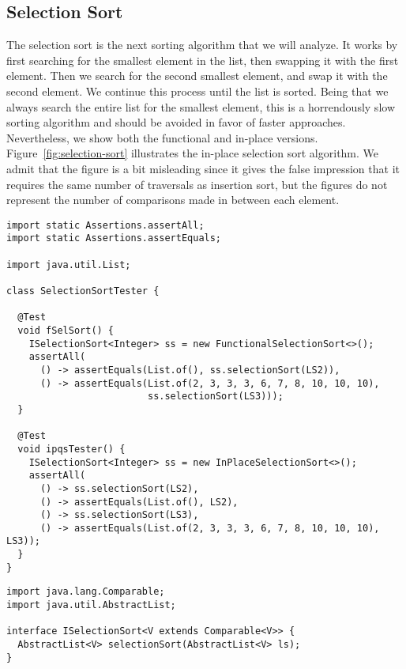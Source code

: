 \subsection{Selection Sort}
The selection sort is the next sorting algorithm that we will analyze. It works by first searching for the smallest element in the list, then swapping it with the first element. Then we search for the second smallest element, and swap it with the second element. We continue this process until the list is sorted. Being that we always search the entire list for the smallest element, this is a horrendously slow sorting algorithm and should be avoided in favor of faster approaches. Nevertheless, we show both the functional and in-place versions. Figure~\ref{fig:selection-sort} illustrates the in-place selection sort algorithm. We admit that the figure is a bit misleading since it gives the false impression that it requires the same number of traversals as insertion sort, but the figures do not represent the number of comparisons made in between each element.

\begin{lstlisting}[language=MyJava]
import static Assertions.assertAll;
import static Assertions.assertEquals;

import java.util.List;

class SelectionSortTester {

  @Test
  void fSelSort() {
    ISelectionSort<Integer> ss = new FunctionalSelectionSort<>();
    assertAll(
      () -> assertEquals(List.of(), ss.selectionSort(LS2)),
      () -> assertEquals(List.of(2, 3, 3, 3, 6, 7, 8, 10, 10, 10), 
                         ss.selectionSort(LS3)));
  }

  @Test
  void ipqsTester() {
    ISelectionSort<Integer> ss = new InPlaceSelectionSort<>();
    assertAll(
      () -> ss.selectionSort(LS2),
      () -> assertEquals(List.of(), LS2),
      () -> ss.selectionSort(LS3),
      () -> assertEquals(List.of(2, 3, 3, 3, 6, 7, 8, 10, 10, 10), LS3));
  }
}
\end{lstlisting}

\begin{lstlisting}[language=MyJava]
import java.lang.Comparable;
import java.util.AbstractList;

interface ISelectionSort<V extends Comparable<V>> {
  AbstractList<V> selectionSort(AbstractList<V> ls);
}
\end{lstlisting}

